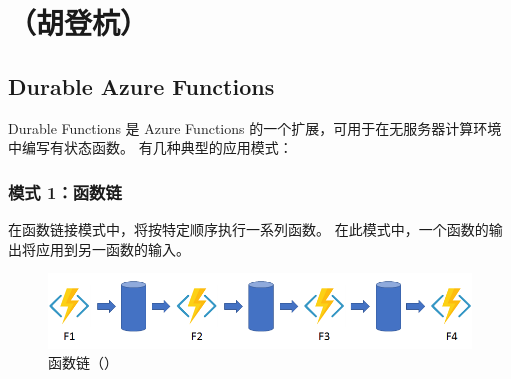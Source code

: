 \documentclass[11pt]{article}
\begin{document}
\newpage
\section{（胡登杭）}
\subsection{Durable Azure Functions}
Durable Functions 是 Azure Functions 的一个扩展，可用于在无服务器计算环境中编写有状态函数。  
有几种典型的应用模式：
\subsubsection{模式 1：函数链}
在函数链接模式中，将按特定顺序执行一系列函数。 在此模式中，一个函数的输出将应用到另一函数的输入。
\begin{figure}[!htbp]
	\centering
	\includegraphics[width=0.8\linewidth]{figs/model1}
	\caption{函数链（\cite{Durable}）}
\end{figure}
\end{document}
